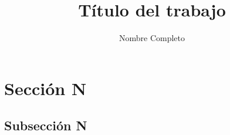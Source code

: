 \documentclass{IEEEtran}
\title{Título del trabajo}
\author{Nombre Completo}
\begin{document}
\maketitle

\begin{abstract}
	
	
\end{abstract}



\section{Sección N}


\subsection{Subsección N}




%
%
\end{document}
